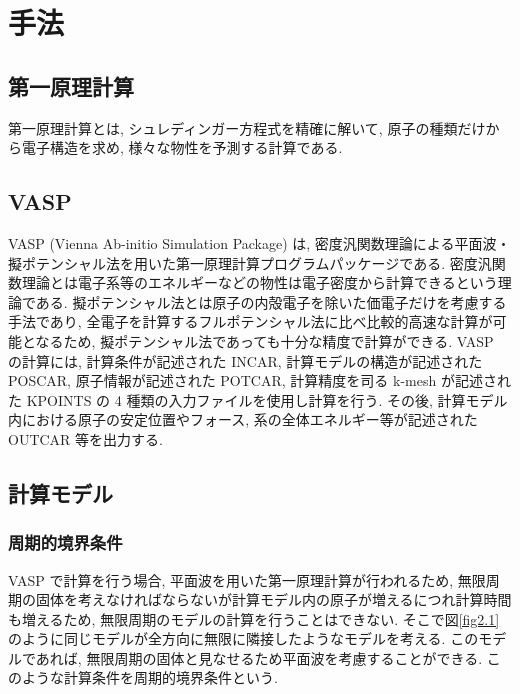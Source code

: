 \chapter{手法}


\section{第一原理計算}
第一原理計算とは, シュレディンガー方程式を精確に解いて, 原子の種類だけから電子構造を求め, 様々な物性を予測する計算である. 


\section{VASP}
VASP (Vienna Ab-initio Simulation Package) は, 密度汎関数理論による平面波・擬ポテンシャル法を用いた第一原理計算プログラムパッケージである. 密度汎関数理論とは電子系等のエネルギーなどの物性は電子密度から計算できるという理論である. 擬ポテンシャル法とは原子の内殻電子を除いた価電子だけを考慮する手法であり, 全電子を計算するフルポテンシャル法に比べ比較的高速な計算が可能となるため, 擬ポテンシャル法であっても十分な精度で計算ができる.
VASP の計算には, 計算条件が記述された INCAR, 計算モデルの構造が記述された POSCAR, 原子情報が記述された POTCAR, 計算精度を司る k-mesh が記述された KPOINTS の 4 種類の入力ファイルを使用し計算を行う. その後, 計算モデル内における原子の安定位置やフォース, 系の全体エネルギー等が記述された OUTCAR 等を出力する.


\section{計算モデル}
\subsection{周期的境界条件}
VASP で計算を行う場合, 平面波を用いた第一原理計算が行われるため, 無限周期の固体を考えなければならないが計算モデル内の原子が増えるにつれ計算時間も増えるため, 無限周期のモデルの計算を行うことはできない. そこで図\ref{fig2.1} のように同じモデルが全方向に無限に隣接したようなモデルを考える. このモデルであれば, 無限周期の固体と見なせるため平面波を考慮することができる. このような計算条件を周期的境界条件という.

